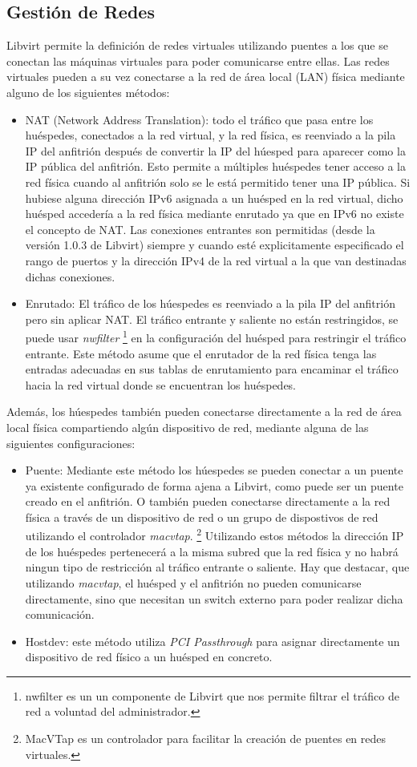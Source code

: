 \documentclass[spanisheDIVcalc,twoside,parskip-,pointlessnumbers,final]{scrbook}
\begin{document}
\subsection{Gestión de Redes}

Libvirt permite la definición de redes virtuales utilizando puentes
a los que se conectan las máquinas virtuales para poder comunicarse
entre ellas. Las redes virtuales pueden a su vez conectarse a la red
de área local (LAN) física mediante alguno de los siguientes métodos:
\begin{itemize}
\item NAT (Network Address Translation): todo el tráfico que pasa entre
los huéspedes, conectados a la red virtual, y la red física, es reenviado
a la pila IP del anfitrión después de convertir la IP del húesped
para aparecer como la IP pública del anfitrión. Esto permite a múltiples
huéspedes tener acceso a la red física cuando al anfitrión solo se
le está permitido tener una IP pública. Si hubiese alguna dirección
IPv6 asignada a un huésped en la red virtual, dicho huésped accedería
a la red física mediante enrutado ya que en IPv6 no existe el concepto
de NAT. Las conexiones entrantes son permitidas (desde la versión
1.0.3 de Libvirt) siempre y cuando esté explicitamente especificado
el rango de puertos y la dirección IPv4 de la red virtual a la que
van destinadas dichas conexiones.
\item Enrutado: El tráfico de los húespedes es reenviado a la pila IP del
anfitrión pero sin aplicar NAT. El tráfico entrante y saliente no
están restringidos, se puede usar \emph{nwfilter}%
\footnote{nwfilter es un un componente de Libvirt que nos permite filtrar el
tráfico de red a voluntad del administrador.%
} en la configuración del huésped para restringir el tráfico entrante.
Este método asume que el enrutador de la red física tenga las entradas
adecuadas en sus tablas de enrutamiento para encaminar el tráfico
hacia la red virtual donde se encuentran los huéspedes.
\end{itemize}
Además, los húespedes también pueden conectarse directamente a la
red de área local física compartiendo algún dispositivo de red, mediante
alguna de las siguientes configuraciones:
\begin{itemize}
\item Puente: Mediante este método los húespedes se pueden conectar a un
puente ya existente configurado de forma ajena a Libvirt, como puede
ser un puente creado en el anfitrión. O también pueden conectarse
directamente a la red física a través de un dispositivo de red o un
grupo de dispostivos de red utilizando el controlador \emph{macvtap}.%
\footnote{MacVTap es un controlador para facilitar la creación de puentes en
redes virtuales.%
} Utilizando estos métodos la dirección IP de los huéspedes pertenecerá
a la misma subred que la red física y no habrá ningun tipo de restricción
al tráfico entrante o saliente. Hay que destacar, que utilizando \emph{macvtap},
el huésped y el anfitrión no pueden comunicarse directamente, sino
que necesitan un switch externo para poder realizar dicha comunicación.
\item Hostdev: este método utiliza \emph{PCI Passthrough} para asignar directamente
un dispositivo de red físico a un huésped en concreto.
\end{itemize}
\end{document}
